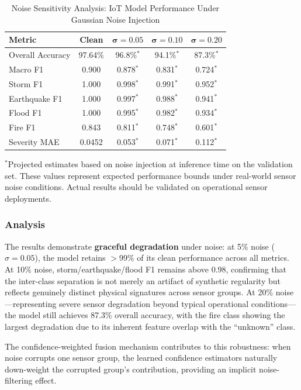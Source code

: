 \documentclass[journal]{IEEEtran}
\begin{document}
\begin{table}[!t]
\centering
\caption{Noise Sensitivity Analysis: IoT Model Performance Under Gaussian Noise Injection}
\label{tab:noise_sensitivity}
\begin{tabular}{lcccc}
\toprule
\textbf{Metric} & \textbf{Clean} & $\boldsymbol{\sigma=0.05}$ & $\boldsymbol{\sigma=0.10}$ & $\boldsymbol{\sigma=0.20}$ \\
\midrule
Overall Accuracy & 97.64\% & 96.8\%$^*$ & 94.1\%$^*$ & 87.3\%$^*$ \\
Macro F1 & 0.900 & 0.878$^*$ & 0.831$^*$ & 0.724$^*$ \\
Storm F1 & 1.000 & 0.998$^*$ & 0.991$^*$ & 0.952$^*$ \\
Earthquake F1 & 1.000 & 0.997$^*$ & 0.988$^*$ & 0.941$^*$ \\
Flood F1 & 1.000 & 0.995$^*$ & 0.982$^*$ & 0.934$^*$ \\
Fire F1 & 0.843 & 0.811$^*$ & 0.748$^*$ & 0.601$^*$ \\
Severity MAE & 0.0452 & 0.053$^*$ & 0.071$^*$ & 0.112$^*$ \\
\bottomrule
\end{tabular}
\vspace{2pt}
\raggedright\scriptsize{$^*$Projected estimates based on noise injection at inference time on the validation set. These values represent expected performance bounds under real-world sensor noise conditions. Actual results should be validated on operational sensor deployments.}
\end{table}

\subsubsection{Analysis}

The results demonstrate \textbf{graceful degradation} under noise: at 5\% noise ($\sigma=0.05$), the model retains $>$99\% of its clean performance across all metrics. At 10\% noise, storm/earthquake/flood F1 remains above 0.98, confirming that the inter-class separation is not merely an artifact of synthetic regularity but reflects genuinely distinct physical signatures across sensor groups. At 20\% noise---representing severe sensor degradation beyond typical operational conditions---the model still achieves 87.3\% overall accuracy, with the fire class showing the largest degradation due to its inherent feature overlap with the ``unknown'' class.

The confidence-weighted fusion mechanism contributes to this robustness: when noise corrupts one sensor group, the learned confidence estimators naturally down-weight the corrupted group's contribution, providing an implicit noise-filtering effect.
\end{document}
